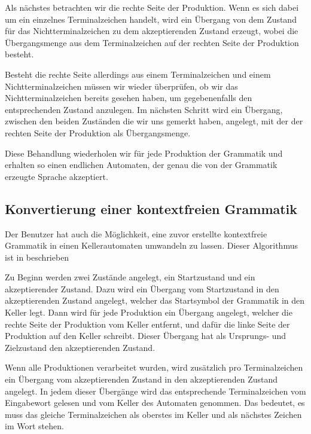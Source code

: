 Als nächstes betrachten wir die rechte Seite der Produktion. Wenn es sich dabei
um ein einzelnes Terminalzeichen handelt, wird ein Übergang von dem Zustand für
das Nichtterminalzeichen zu dem akzeptierenden Zustand erzeugt, wobei die
Übergangsmenge aus dem Terminalzeichen auf der rechten Seite der Produktion
besteht.\vspace{10pt}

Besteht die rechte Seite allerdings aus einem Terminalzeichen und einem
Nichtterminalzeichen müssen wir wieder überprüfen, ob wir das
Nichtterminalzeichen bereits gesehen haben, um gegebenenfalls den
entsprechenden Zustand anzulegen. Im nächsten Schritt wird ein Übergang,
zwischen den beiden Zuständen die wir uns gemerkt haben, angelegt, mit der der
rechten Seite der Produktion als Übergangsmenge.\vspace{10pt}

Diese Behandlung wiederholen wir für jede Produktion der Grammatik und
erhalten so einen endlichen Automaten, der genau die von der
Grammatik erzeugte Sprache akzeptiert.\vspace{10pt}


\subsection{Konvertierung einer kontextfreien Grammatik}\label{ConverToGrammarContextFree}

Der Benutzer hat auch die Möglichkeit, eine zuvor erstellte kontextfreie
Grammatik in einen Kellerautomaten umwandeln zu lassen. Dieser
Algorithmus ist in \cite{Compilers} beschrieben\vspace{10pt}

Zu Beginn werden zwei Zustände angelegt, ein Startzustand und ein
akzeptierender Zustand. Dazu wird ein Übergang vom Startzustand in den
akzeptierenden Zustand angelegt, welcher das Startsymbol der Grammatik in den
Keller legt. Dann wird für jede Produktion ein Übergang angelegt, welcher die rechte
Seite der Produktion vom Keller entfernt, und dafür die linke Seite der
Produktion auf den Keller schreibt. Dieser Übergang hat als
Ursprungs- und Zielzustand den akzeptierenden Zustand.\vspace{10pt}

Wenn alle Produktionen verarbeitet wurden, wird zusätzlich pro Terminalzeichen
ein Übergang vom akzeptierenden Zustand in den akzeptierenden Zustand angelegt.
In jedem dieser Übergänge wird das entsprechende Terminalzeichen vom Eingabewort
gelesen und vom Keller des Automaten genommen. Das bedeutet, es muss das gleiche
Terminalzeichen als oberstes im Keller  und als nächstes Zeichen im Wort
stehen.\vspace{10pt}

